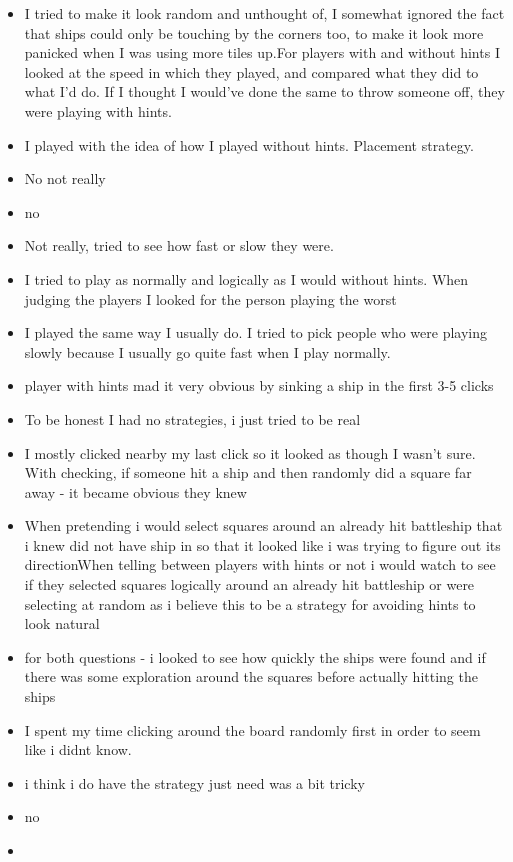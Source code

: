 \documentclass[
  english,
  man]{apa6}
\begin{document}
\begin{itemize}
\item
  I tried to make it look random and unthought of, I somewhat ignored the fact that ships could only be touching by the corners too, to make it look more panicked when I was using more tiles up.For players with and without hints I looked at the speed in which they played, and compared what they did to what I'd do. If I thought I would've done the same to throw someone off, they were playing with hints.
\item
  I played with the idea of how I played without hints. Placement strategy.
\item
  No not really
\item
  no
\item
  Not really, tried to see how fast or slow they were.
\item
  I tried to play as normally and logically as I would without hints. When judging the players I looked for the person playing the worst
\item
  I played the same way I usually do. I tried to pick people who were playing slowly because I usually go quite fast when I play normally.
\item
  player with hints mad it very obvious by sinking a ship in the first 3-5 clicks
\item
  To be honest I had no strategies, i just tried to be real
\item
  I mostly clicked nearby my last click so it looked as though I wasn't sure. With checking, if someone hit a ship and then randomly did a square far away - it became obvious they knew
\item
  When pretending i would select squares around an already hit battleship that i knew did not have ship in so that it looked like i was trying to figure out its directionWhen telling between players with hints or not i would watch to see if they selected squares logically around an already hit battleship or were selecting at random as i believe this to be a strategy for avoiding hints to look natural
\item
  for both questions - i looked to see how quickly the ships were found and if there was some exploration around the squares before actually hitting the ships
\item
  I spent my time clicking around the board randomly first in order to seem like i didnt know.
\item
  i think i do have the strategy just need was a bit tricky
\item
  no
\item

\end{itemize}
\end{document}
